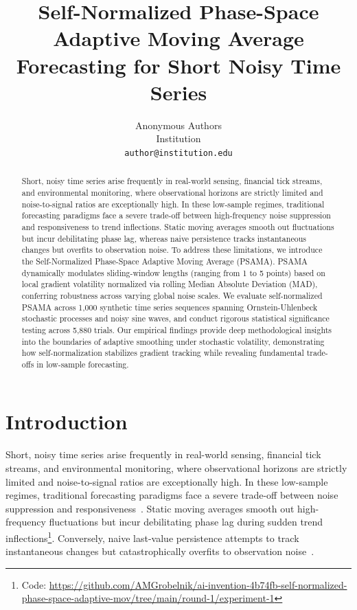 \documentclass[10type,twocolumn,letterpaper]{article}
\begin{document}
\title{Self-Normalized Phase-Space Adaptive Moving Average Forecasting for Short Noisy Time Series}

\author{Anonymous Authors\\
Institution\\
{\tt\small author@institution.edu}
}

\maketitle

\begin{abstract}
Short, noisy time series arise frequently in real-world sensing, financial tick streams, and environmental monitoring, where observational horizons are strictly limited and noise-to-signal ratios are exceptionally high. In these low-sample regimes, traditional forecasting paradigms face a severe trade-off between high-frequency noise suppression and responsiveness to trend inflections. Static moving averages smooth out fluctuations but incur debilitating phase lag, whereas naive persistence tracks instantaneous changes but overfits to observation noise. To address these limitations, we introduce the Self-Normalized Phase-Space Adaptive Moving Average (PSAMA). PSAMA dynamically modulates sliding-window lengths (ranging from 1 to 5 points) based on local gradient volatility normalized via rolling Median Absolute Deviation (MAD), conferring robustness across varying global noise scales. We evaluate self-normalized PSAMA across 1,000 synthetic time series sequences spanning Ornstein-Uhlenbeck stochastic processes and noisy sine waves, and conduct rigorous statistical significance testing across 5,880 trials. Our empirical findings provide deep methodological insights into the boundaries of adaptive smoothing under stochastic volatility, demonstrating how self-normalization stabilizes gradient tracking while revealing fundamental trade-offs in low-sample forecasting.
\end{abstract}

\section{Introduction}

Short, noisy time series arise frequently in real-world sensing, financial tick streams, and environmental monitoring, where observational horizons are strictly limited and noise-to-signal ratios are exceptionally high. In these low-sample regimes, traditional forecasting paradigms face a severe trade-off between noise suppression and responsiveness~\cite{box1970time}. Static moving averages smooth out high-frequency fluctuations but incur debilitating phase lag during sudden trend inflections\footnote{Code: \url{https://github.com/AMGrobelnik/ai-invention-4b74fb-self-normalized-phase-space-adaptive-mov/tree/main/round-1/experiment-1}}. Conversely, naive last-value persistence attempts to track instantaneous changes but catastrophically overfits to observation noise~\cite{widrow1975adaptive}.
\end{document}
